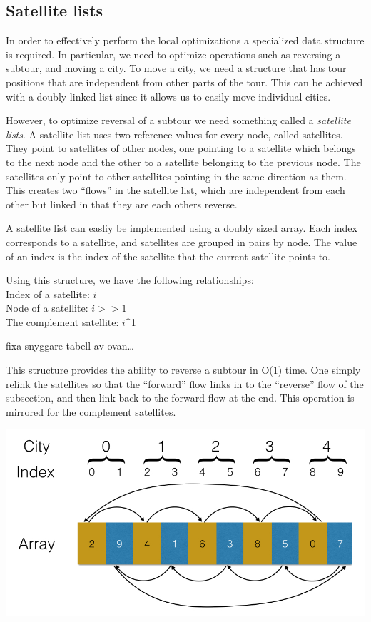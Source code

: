 \documentclass[paper=a4, fontsize=11pt,numbers=endperiod]{scrartcl} %
\numberwithin{equation}{section} %
\numberwithin{figure}{section} %
\numberwithin{table}{section} %
\begin{document}
\subsection{Satellite lists}
In order to effectively perform the local optimizations a specialized data structure is required.
In particular, we need to optimize operations such as reversing a subtour, and moving a city.
To move a city, we need a structure that has tour positions that are independent from other parts of the tour.
This can be achieved with a doubly linked list since it allows us to easily move individual cities.

However, to optimize reversal of a subtour we need something called a \emph{satellite lists}.\cite{satellite}
A satellite list uses two reference values for every node, called satellites.
They point to satellites of other nodes, one pointing to a satellite which belongs to the next node and the other to a satellite belonging to the previous node.
The satellites only point to other satellites pointing in the same direction as them.
This creates two ``flows'' in the satellite list, which are independent from each other but linked in that they are each others reverse.

A satellite list can easliy be implemented using a doubly sized array.
Each index corresponds to a satellite, and satellites are grouped in pairs by node.
The value of an index is the index of the satellite that the current satellite points to.

Using this structure, we have the following relationships:\\
Index of a satellite: $i$\\
Node of a satellite: $i>>1$\\
The complement satellite: $i$\^{}1

fixa snyggare tabell av ovan\dots

This structure provides the ability to reverse a subtour in O(1) time.
One simply relink the satellites so that the ``forward'' flow links in to the ``reverse'' flow of the subsection, and then link back to the forward flow at the end.
This operation is mirrored for the complement satellites.

\begin{center}
\includegraphics[scale=0.3]{satellite}
\end{center}
\end{document}
